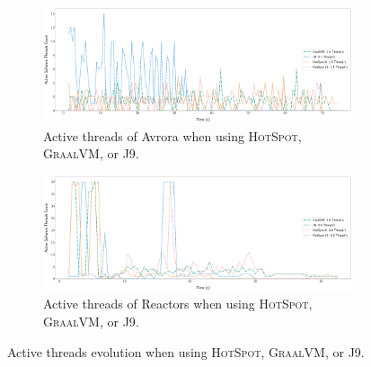 \begin{figure}%
    \begin{subfigure}{\textwidth}
        \includegraphics[width=.9\linewidth]{imgs/active_threads_avrora_chetemi_3}
        \centering
        \captionsetup{justification=centering}
        \caption{Active threads of \textsf{Avrora} when using \textsc{HotSpot}, \textsc{GraalVM}, or \textsc{J9}.}
        \label{fig:avrora_threads}
    \end{subfigure}
    \begin{subfigure}{\textwidth}
        \includegraphics[width=.9\linewidth]{imgs/active_threads_reactors_chetemi_3}
        \centering
        \captionsetup{justification=centering}
        \caption{Active threads of \textsf{Reactors} when using \textsc{HotSpot}, \textsc{GraalVM}, or \textsc{J9}.}
        \label{fig:reactors_threads}
    \end{subfigure}
    \caption{Active threads evolution when using \textsc{HotSpot}, \textsc{GraalVM}, or \textsc{J9}.}
    \label{fig:threads}
\end{figure}


